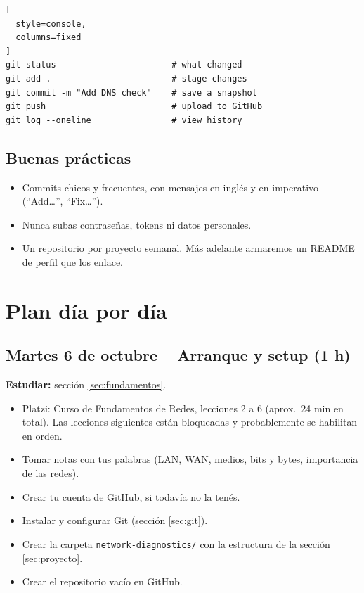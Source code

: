 \documentclass[11pt,a4paper]{article}
\theoremstyle{definition}
\theoremstyle{remark}
\begin{document}
\begin{lstlisting}[
  style=console,
  columns=fixed
]
git status                       # what changed
git add .                        # stage changes
git commit -m "Add DNS check"    # save a snapshot
git push                         # upload to GitHub
git log --oneline                # view history
\end{lstlisting}

\subsection{Buenas prácticas}

\begin{itemize}
  \item Commits chicos y frecuentes, con mensajes en inglés y en imperativo (``Add\dots'', ``Fix\dots'').
  \item Nunca subas contraseñas, tokens ni datos personales.
  \item Un repositorio por proyecto semanal. Más adelante armaremos un README de perfil que los enlace.
\end{itemize}

\section{Plan día por día}\label{sec:plan}

\subsection{Martes 6 de octubre -- Arranque y setup (1 h)}

\textbf{Estudiar:} sección \ref{sec:fundamentos}.

\begin{itemize}[label=$\square$]
  \item Platzi: Curso de Fundamentos de Redes, lecciones 2 a 6 (aprox.\ 24 min en total). Las lecciones siguientes están bloqueadas y probablemente se habilitan en orden.
  \item Tomar notas con tus palabras (LAN, WAN, medios, bits y bytes, importancia de las redes).
  \item Crear tu cuenta de GitHub, si todavía no la tenés.
  \item Instalar y configurar Git (sección \ref{sec:git}).
  \item Crear la carpeta \texttt{network-diagnostics/} con la estructura de la sección \ref{sec:proyecto}.
  \item Crear el repositorio vacío en GitHub.
\end{itemize}
\end{document}
